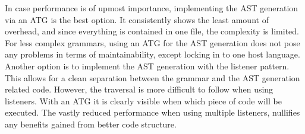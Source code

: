 In case performance is of upmost importance, implementing the AST generation via an ATG is the best option. It consistently shows the least amount of overhead, and since everything is contained in one file, the complexity is limited. For less complex grammars, using an ATG for the AST generation does not pose any problems in terms of maintainability, except locking in to one host language. Another option is to implement the AST generation with the listener pattern. This allows for a clean separation between the grammar and the AST generation related code. However, the traversal is more difficult to follow when using listeners. With an ATG it is clearly visible when which piece of code will be executed. The vastly reduced performance when using multiple listeners, nullifies any benefits gained from better code structure.